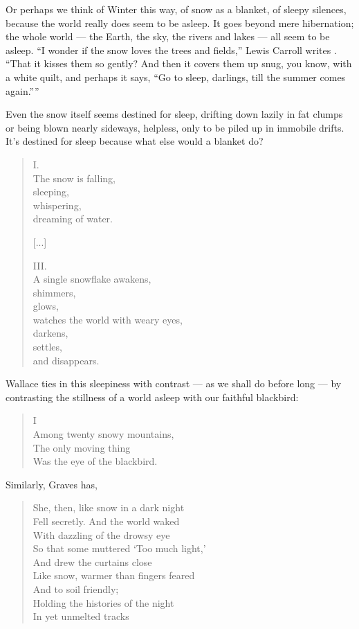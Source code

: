 \documentclass[12pt,oneside]{memoir}
\begin{document}
Or perhaps we think of Winter this way, of snow as a blanket, of sleepy silences, because the world really does seem to be asleep. It goes beyond mere hibernation; the whole world --- the Earth, the sky, the rivers and lakes --- all seem to be asleep. ``I wonder if the snow loves the trees and fields,'' Lewis Carroll writes \parencite{carroll}. ``That it kisses them so gently? And then it covers them up snug, you know, with a white quilt, and perhaps it says, ``Go to sleep, darlings, till the summer comes again.''''

Even the snow itself seems destined for sleep, drifting down lazily in fat clumps or being blown nearly sideways, helpless, only to be piled up in immobile drifts. It's destined for sleep because what else would a blanket do?

\begin{verse}
I. \\
The snow is falling, \\
sleeping, \\
whispering, \\
dreaming of water.

[...]

III. \\
A single snowflake awakens, \\
shimmers, \\
glows, \\
watches the world with weary eyes, \\
darkens, \\
settles, \\
and disappears.

\parencite{esch}
\end{verse}

Wallace ties in this sleepiness with contrast --- as we shall do before long --- by contrasting the stillness of a world asleep with our faithful blackbird:

\begin{verse}
I \\
Among twenty snowy mountains, \\
The only moving thing \\
Was the eye of the blackbird.

\parencite{blackbird}
\end{verse}

Similarly, Graves has,

\begin{verse}
She, then, like snow in a dark night \\
Fell secretly. And the world waked \\
With dazzling of the drowsy eye \\
So that some muttered `Too much light,' \\
And drew the curtains close \\
Like snow, warmer than fingers feared \\
And to soil friendly; \\
Holding the histories of the night \\
In yet unmelted tracks

\parencite[143]{graves_poems}
\end{verse}
\end{document}
